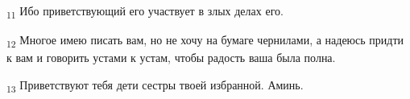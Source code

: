 \begin{tcolorbox}
\textsubscript{11} Ибо приветствующий его участвует в злых делах его.
\end{tcolorbox}
\begin{tcolorbox}
\textsubscript{12} Многое имею писать вам, но не хочу на бумаге чернилами, а надеюсь придти к вам и говорить устами к устам, чтобы радость ваша была полна.
\end{tcolorbox}
\begin{tcolorbox}
\textsubscript{13} Приветствуют тебя дети сестры твоей избранной. Аминь.
\end{tcolorbox}
